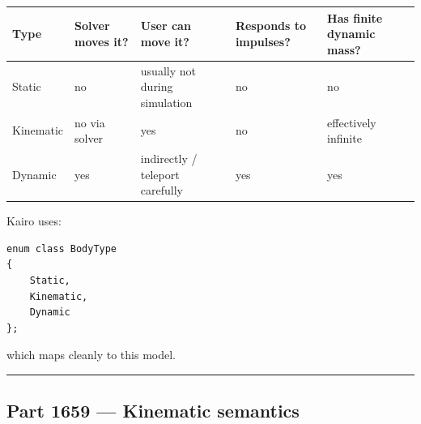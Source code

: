 {\def\LTcaptype{none} %
\begin{longtable}[]{@{}
  >{\raggedright\arraybackslash}p{}
  >{\raggedleft\arraybackslash}p{}
  >{\raggedleft\arraybackslash}p{}
  >{\raggedleft\arraybackslash}p{}
  >{\raggedleft\arraybackslash}p{}@{}}
\toprule\noalign{}
\begin{minipage}[b]{\linewidth}\raggedright
Type
\end{minipage} & \begin{minipage}[b]{\linewidth}\raggedleft
Solver moves it?
\end{minipage} & \begin{minipage}[b]{\linewidth}\raggedleft
User can move it?
\end{minipage} & \begin{minipage}[b]{\linewidth}\raggedleft
Responds to impulses?
\end{minipage} & \begin{minipage}[b]{\linewidth}\raggedleft
Has finite dynamic mass?
\end{minipage} \\
\midrule\noalign{}
\endhead
\bottomrule\noalign{}
\endlastfoot
Static & no & usually not during simulation & no & no \\
Kinematic & no via solver & yes & no & effectively infinite \\
Dynamic & yes & indirectly / teleport carefully & yes & yes \\
\end{longtable}
}

Kairo uses:

\begin{verbatim}
enum class BodyType
{
    Static,
    Kinematic,
    Dynamic
};
\end{verbatim}

which maps cleanly to this model.

\begin{center}\rule{0.5\linewidth}{0.5pt}\end{center}

\subsection{Part 1659 --- Kinematic semantics}\label{06-engine-ii-ch037-part-1659-kinematic-semantics}

